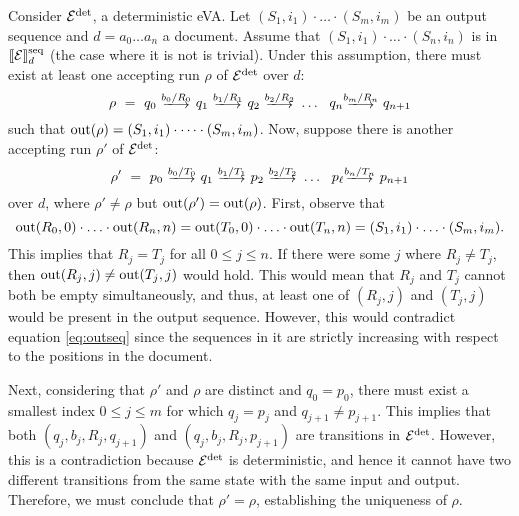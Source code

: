 Consider $\mathcal{E}^{{\operatorname{det}}}$, a deterministic eVA. Let $(S_1, i_1)\cdot \ldots \cdot (S_m, i_m)$ be an output sequence and $d = a_0\ldots a_n$ a document. Assume that $(S_1, i_1)\cdot \ldots \cdot (S_n, i_n)$ is in $\llbracket\mathcal{E}\rrbracket^{\operatorname{seq}}_d$ (the case where it is not is trivial). Under this assumption, there must exist at least one accepting run $\rho$ of $\mathcal{E}^{{\operatorname{det}}}$ over $d$:
$$
\rho \ = \ q_0 \ \longtrans{b_0 / R_0} \ q_1 \ \longtrans{b_1 / R_1} \ q_2 \ \longtrans{b_2 / R_2} \ \ldots \ \ q_{n} \longtrans{b_{m} / R_n} \ q_{n+1}
$$
such that $\operatorname{out}(\rho) = (S_1, i_1)\cdot \cdots \cdot (S_m, i_m)$. Now, suppose there is another accepting run $\rho'$ of $\mathcal{E}^{{\operatorname{det}}}$:
$$
\rho' \ = \ p_0 \ \longtrans{b_0 / T_0} \ q_1 \ \longtrans{b_1 / T_1} \ p_2 \ \longtrans{b_2 / T_2} \ \ldots \ \ p_{\ell} \longtrans{b_n / T_n} \ p_{n+1}
$$
over $d$, where $\rho' \neq \rho$ but $\operatorname{out}(\rho') = \operatorname{out}(\rho)$. First, observe that
\begin{equation} \label{eq:outseq}
\operatorname{out}(R_0, 0)\cdot \ldots \cdot \operatorname{out}(R_n, n) = \operatorname{out}(T_0, 0)\cdot \ldots \cdot \operatorname{out}(T_n, n) = (S_1, i_1)\cdot \ldots \cdot (S_m, i_m).
\end{equation}
This implies that $R_j = T_j$ for all $0 \leq j \leq n$. If there were some $j$ where $R_j \neq T_j$, then $\operatorname{out}(R_j, j) \neq \operatorname{out}(T_j, j)$ would hold. This would mean that $R_j$ and $T_j$ cannot both be empty simultaneously, and thus, at least one of $(R_j, j)$ and $(T_j, j)$ would be present in the output sequence. However, this would contradict equation \eqref{eq:outseq} since the sequences in it are strictly increasing with respect to the positions in the document.

Next, considering that $\rho'$ and $\rho$ are distinct and $q_0 = p_0$, there must exist a smallest index $0 \leq j \leq m$ for which $q_j = p_j$ and $q_{j+1} \neq p_{j+1}$. This implies that both $(q_j, b_j, R_j, q_{j+1})$ and $(q_j, b_j, R_j, p_{j+1})$ are transitions in $\mathcal{E}^{\operatorname{det}}$. However, this is a contradiction because $\mathcal{E}^{{\operatorname{det}}}$ is deterministic, and hence it cannot have two different transitions from the same state with the same input and output. Therefore, we must conclude that $\rho' = \rho$, establishing the uniqueness of $\rho$.
